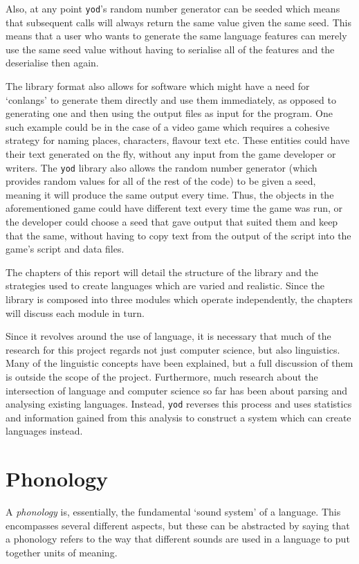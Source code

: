 \documentclass{report}
\begin{document}
   Also, at any point \texttt{yod}'s random number generator can be seeded which means that subsequent calls will always return the same value given the same seed. This means that a user who wants to generate the same language features can merely use the same seed value without having to serialise all of the features and the deserialise then again.
   
   The library format also allows for software which might have a need for `conlangs' to generate them directly and use them immediately, as opposed to generating one and then using the output files as input for the program. One such example could be in the case of a video game which requires a cohesive strategy for naming places, characters, flavour text etc. These entities could have their text generated on the fly, without any input from the game developer or writers. The \texttt{yod} library also allows the random number generator (which provides random values for all of the rest of the code) to be given a seed, meaning it will produce the same output every time. Thus, the objects in the aforementioned game could have different text every time the game was run, or the developer could choose a seed that gave output that suited them and keep that the same, without having to copy text from the output of the script into the game's script and data files.
   
   The chapters of this report will detail the structure of the library and the strategies used to create languages which are varied and realistic. Since the library is composed into three modules which operate independently, the chapters will discuss each module in turn.
   
   Since it revolves around the use of language, it is necessary that much of the research for this project regards not just computer science, but also linguistics. Many of the linguistic concepts have been explained, but a full discussion of them is outside the scope of the project. Furthermore, much research about the intersection of language and computer science so far has been about parsing and analysing existing languages. Instead, \texttt{yod} reverses this process and uses statistics and information gained from this analysis to construct a system which can create languages instead.
   
   \chapter{Phonology}
   \label{chapter: phonology}
   A \textit{phonology} is, essentially, the fundamental `sound system' of a language. This encompasses several different aspects, but these can be abstracted by saying that a phonology refers to the way that different sounds are used in a language to put together units of meaning. 
   
\end{document}
